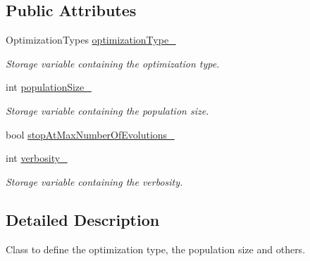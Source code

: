 \subsection*{Public Attributes}
\begin{DoxyCompactItemize}
\item 
Optimization\+Types \hyperlink{structtudat_1_1optimization_1_1OptimizationSettings_a68d89e94f78741e391af984fc157ade9}{optimization\+Type\+\_\+}\hypertarget{structtudat_1_1optimization_1_1OptimizationSettings_a68d89e94f78741e391af984fc157ade9}{}\label{structtudat_1_1optimization_1_1OptimizationSettings_a68d89e94f78741e391af984fc157ade9}

\begin{DoxyCompactList}\small\item\em Storage variable containing the optimization type. \end{DoxyCompactList}\item 
int \hyperlink{structtudat_1_1optimization_1_1OptimizationSettings_a83e9993ce6e1a43f2ec887c1f57d081f}{population\+Size\+\_\+}\hypertarget{structtudat_1_1optimization_1_1OptimizationSettings_a83e9993ce6e1a43f2ec887c1f57d081f}{}\label{structtudat_1_1optimization_1_1OptimizationSettings_a83e9993ce6e1a43f2ec887c1f57d081f}

\begin{DoxyCompactList}\small\item\em Storage variable containing the population size. \end{DoxyCompactList}\item 
bool \hyperlink{structtudat_1_1optimization_1_1OptimizationSettings_a84e30eafb2caf9bfbb1a910ece971b5a}{stop\+At\+Max\+Number\+Of\+Evolutions\+\_\+}
\item 
int \hyperlink{structtudat_1_1optimization_1_1OptimizationSettings_aab965914d38b47a749d5fa6c7aaf9ee3}{verbosity\+\_\+}\hypertarget{structtudat_1_1optimization_1_1OptimizationSettings_aab965914d38b47a749d5fa6c7aaf9ee3}{}\label{structtudat_1_1optimization_1_1OptimizationSettings_aab965914d38b47a749d5fa6c7aaf9ee3}

\begin{DoxyCompactList}\small\item\em Storage variable containing the verbosity. \end{DoxyCompactList}\end{DoxyCompactItemize}


\subsection{Detailed Description}
Class to define the optimization type, the population size and others. 

